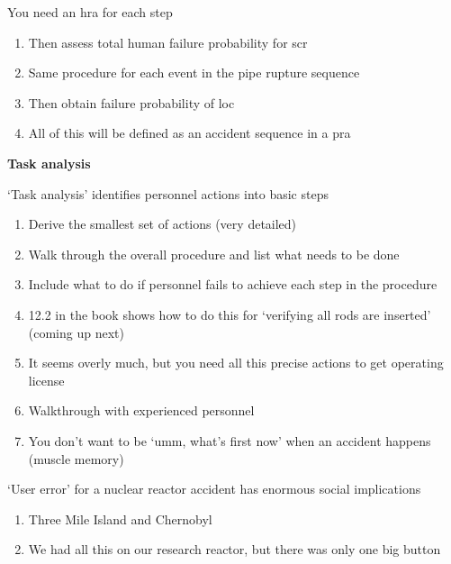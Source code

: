 \documentclass[aspectratio=1610,pdftex,dvipsnames,compress,xcolor={dvipsnames}]{beamer}
\newcommand{\acs}{\acrshort} %
\begin{document}
\begin{frame}{You need an \acs{hra} for each step}
    \begin{enumerate}[series=outerlist,topsep=0pt,itemsep=21pt,leftmargin=*,label=(\arabic*)]
        \item[]Then assess total human failure probability for \acs{scr}
        \item[]Same procedure for each event in the pipe rupture sequence
        \item[]Then obtain failure probability of \acs{loc}
        \item[]All of this will be defined as an accident sequence in a \acs{pra}
    \end{enumerate}
\end{frame}


\begin{frame}[plain]{}
    \centering\LARGE\textbf{Task analysis}
\end{frame}


\addtocounter{framenumber}{-1}
\begin{frame}{`Task analysis' identifies personnel actions into basic steps}
    \begin{enumerate}[series=outerlist,topsep=0pt,itemsep=15pt,leftmargin=*,label=(\arabic*)]
        \item[]Derive the smallest set of actions (very detailed)
        \item[]Walk through the overall procedure and list what needs to be done  
        \item[]Include what to do if personnel fails to achieve each step in the procedure  
        \item[]12.2 in the book shows how to do this for `verifying all rods are inserted' (coming up next)
        \item[]It seems overly much, but you need all this precise actions to get operating license
        \item[]Walkthrough with experienced personnel 
        \item[]You don't want to be `umm, what's first now' when an accident happens (muscle memory)
    \end{enumerate}
\end{frame}


\begin{frame}{`User error' for a nuclear reactor accident has enormous social implications}
    \begin{enumerate}[series=outerlist,topsep=0pt,itemsep=21pt,leftmargin=*,label=(\arabic*)]
        \item[]Three Mile Island and Chernobyl
        \item[]We had all this on our research reactor, but there was only one big button
    \end{enumerate}
\end{frame}
\end{document}
